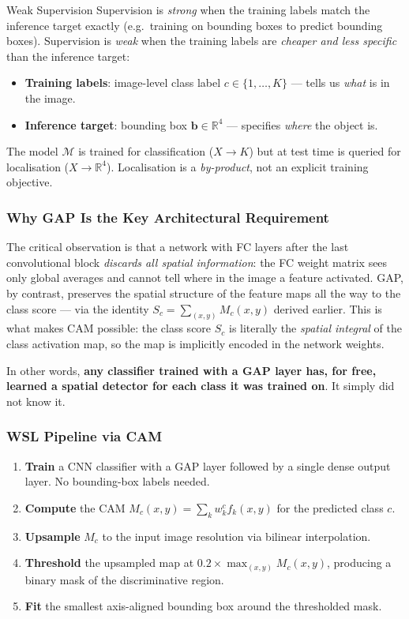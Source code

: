 \documentclass[11pt,a4paper]{article}
\begin{document}
\begin{defbox}{Weak Supervision}
Supervision is \emph{strong} when the training labels match the inference target exactly (e.g.\ training on bounding boxes to predict bounding boxes). Supervision is \emph{weak} when the training labels are \emph{cheaper and less specific} than the inference target:
\begin{itemize}
  \item \textbf{Training labels}: image-level class label $c \in \{1,\ldots,K\}$ — tells us \emph{what} is in the image.
  \item \textbf{Inference target}: bounding box $\mathbf{b} \in \mathbb{R}^4$ — specifies \emph{where} the object is.
\end{itemize}
The model $\mathcal{M}$ is trained for classification ($X \to K$) but at test time is queried for localisation ($X \to \mathbb{R}^4$). Localisation is a \emph{by-product}, not an explicit training objective.
\end{defbox}

\subsubsection{Why GAP Is the Key Architectural Requirement}

The critical observation is that a network with FC layers after the last convolutional block \emph{discards all spatial information}: the FC weight matrix sees only global averages and cannot tell where in the image a feature activated. GAP, by contrast, preserves the spatial structure of the feature maps all the way to the class score — via the identity $S_c = \sum_{(x,y)} M_c(x,y)$ derived earlier. This is what makes CAM possible: the class score $S_c$ is literally the \emph{spatial integral} of the class activation map, so the map is implicitly encoded in the network weights.

In other words, \textbf{any classifier trained with a GAP layer has, for free, learned a spatial detector for each class it was trained on}. It simply did not know it.

\subsubsection{WSL Pipeline via CAM}

\begin{enumerate}
  \item \textbf{Train} a CNN classifier with a GAP layer followed by a single dense output layer. No bounding-box labels needed.
  \item \textbf{Compute} the CAM $M_c(x,y) = \sum_k w_k^c f_k(x,y)$ for the predicted class $c$.
  \item \textbf{Upsample} $M_c$ to the input image resolution via bilinear interpolation.
  \item \textbf{Threshold} the upsampled map at $0.2 \times \max_{(x,y)} M_c(x,y)$, producing a binary mask of the discriminative region.
  \item \textbf{Fit} the smallest axis-aligned bounding box around the thresholded mask.
\end{enumerate}
\end{document}
